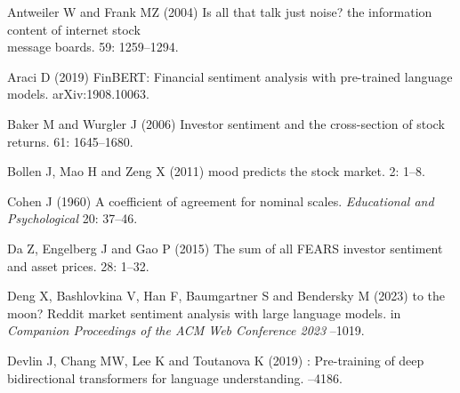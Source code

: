 \documentclass{aims}
\numberwithin{equation}{section}
\begin{document}
\begin{thebibliography}{}

\newblock Antweiler W and Frank MZ (2004)
\newblock Is all that talk just noise? the information content of internet stock\\ 
message boards.
 59: 1259--1294. 

\newblock Araci D (2019)
\newblock FinBERT: Financial sentiment analysis with pre-trained language models.
\newblock arXiv:1908.10063. 

\newblock Baker M and Wurgler J (2006)
\newblock Investor sentiment and the cross-section of stock returns.
 61: 1645--1680. 

\newblock Bollen J, Mao H and Zeng X (2011)
 mood predicts the stock market.
 2: 1--8. 

\newblock Cohen J (1960)
\newblock A coefficient of agreement for nominal scales. {\em Educational and Psychological}
 20: 37--46. 
  
\newblock Da Z, Engelberg J and Gao P (2015)
\newblock The sum of all {FEARS} investor sentiment and asset prices.
 28: 1--32. 
  
\newblock Deng X, Bashlovkina V, Han F, Baumgartner S and Bendersky M (2023)
 to the moon? {Reddit} market sentiment analysis with large
  language models.
\newblock in {\em Companion Proceedings of the ACM Web Conference 2023}
--1019. 

\newblock Devlin J, Chang MW, Lee K and Toutanova K (2019)
: Pre-training of deep bidirectional transformers for language understanding.
--4186. 


\end{thebibliography}
\end{document}
